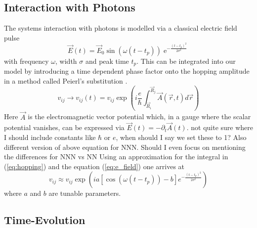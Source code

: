 \subsection{Interaction with Photons}
The systems interaction with photons is modelled via a classical electric field pulse
\begin{equation}
    \Vec{E}(t) = \Vec{E}_0 \sin(\omega(t-t_p))\operatorname{e}^{-\frac{(t-t_p)^2}{2\sigma^2}} \label{eq:e_field}
\end{equation}
with frequency $\omega$, width $\sigma$ and peak time $t_p$. This can be integrated into our model by introducing a time dependent phase factor onto the hopping amplitude in a method called Peierl's substitution \cite{peierl}.
\begin{equation}
    v_{ij} \to v_{ij}(t) = v_{ij}\exp\left(i\frac{e}{\hbar} \int_{\Vec{R}_i}^{\Vec{R}_j} \Vec{A}(\Vec{r},t) d\Vec{r}\right)\label{eq:hopping}
\end{equation}
Here $\Vec{A}$ is the electromagnetic vector potential which, in a gauge where the scalar potential vanishes, can be expressed via $\Vec{E}(t) = -\partial_t \Vec{A}(t)$. {\color{red} not quite sure where I should include constants like $\hbar$ or $e$, when should I say we set these to 1? Also different version of above equation for NNN. Should I even focus on mentioning the differences for NNN vs NN} Using an approximation for the integral in (\ref{eq:hopping}) and the equation (\ref{eq:e_field}) one arrives at
\begin{equation}
    v_{ij} \approx v_{ij} \exp\left(ia[\cos(\omega (t-t_p))-b] e^{-\frac{(t-t_p)^2}{2\sigma^2}}\right)
\end{equation}
where $a$ and $b$ are tunable parameters.


\subsection{Time-Evolution}

